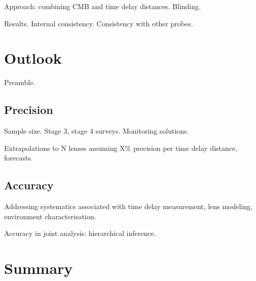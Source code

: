 Approach: combining CMB and time delay distances. Blinding.

Results. Internal consistency. Consistency with other probes.



\section{Outlook}
\label{sec:cosmo}

Preamble.


\subsection{Precision}

Sample size. Stage 3, stage 4 surveys. Monitoring solutions.

Extrapolations to N lenses assuming X\% precision per time delay
distance, forecasts.


\subsection{Accuracy}

Addressing systematics associated with time delay measurement, lens
modeling, environment characterisation.

Accuracy in joint analysis: hierarchical inference.



\section{Summary}
\label{sec:summary}



